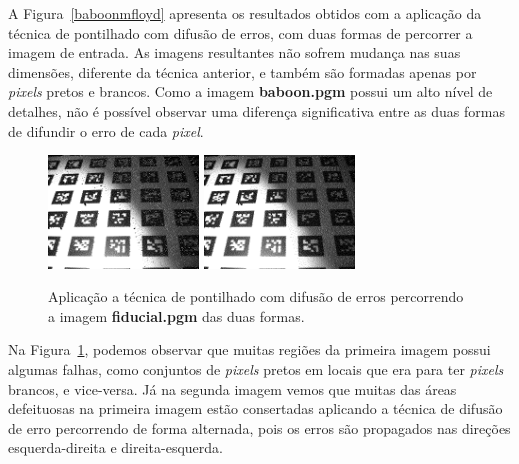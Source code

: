 \documentclass[twoside,twocolumn]{article}
\begin{document}
A Figura~\ref{baboonmfloyd} apresenta os resultados obtidos com a aplicação da técnica de pontilhado com difusão de erros, com duas formas de percorrer a imagem de entrada. As imagens resultantes não sofrem mudança nas suas dimensões, diferente da técnica anterior, e também são formadas apenas por \textit{pixels} pretos e brancos. Como a imagem \textbf{baboon.pgm} possui um alto nível de detalhes, não é possível observar uma diferença significativa entre as duas formas de difundir o erro de cada \textit{pixel}.

\begin{figure}[H]
\begin{center}
	\includegraphics[height=3cm]{figures/fiducial_floyd_order1.png}
	\includegraphics[height=3cm]{figures/fiducial_floyd_order2.png}
\caption{Aplicação a técnica de pontilhado com difusão de erros percorrendo a imagem \textbf{fiducial.pgm} das duas formas.} \label{fiducialfloyd}
\end{center}
\end{figure}

Na Figura~\ref{fiducialfloyd}, podemos observar que muitas regiões da primeira imagem possui algumas falhas, como conjuntos de \textit{pixels} pretos em locais que era para ter \textit{pixels} brancos, e vice-versa. Já na segunda imagem vemos que muitas das áreas defeituosas na primeira imagem estão consertadas aplicando a técnica de difusão de erro percorrendo de forma alternada, pois os erros são propagados nas direções esquerda-direita e direita-esquerda.
\end{document}
